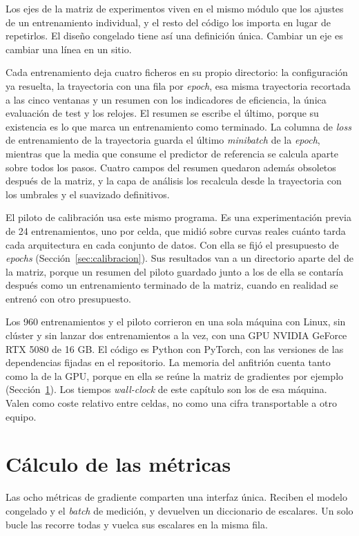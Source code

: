 Los ejes de la matriz de experimentos viven en el mismo módulo que los ajustes de un entrenamiento individual, y el resto del código los importa en lugar de repetirlos. El diseño congelado tiene así una definición única. Cambiar un eje es cambiar una línea en un sitio.

Cada entrenamiento deja cuatro ficheros en su propio directorio: la configuración ya resuelta, la trayectoria con una fila por \emph{epoch}, esa misma trayectoria recortada a las cinco ventanas y un resumen con los indicadores de eficiencia, la única evaluación de test y los relojes. El resumen se escribe el último, porque su existencia es lo que marca un entrenamiento como terminado. La columna de \emph{loss} de entrenamiento de la trayectoria guarda el último \emph{minibatch} de la \emph{epoch}, mientras que la media que consume el predictor de referencia se calcula aparte sobre todos los pasos. Cuatro campos del resumen quedaron además obsoletos después de la matriz, y la capa de análisis los recalcula desde la trayectoria con los umbrales y el suavizado definitivos.

El piloto de calibración usa este mismo programa. Es una experimentación previa de 24 entrenamientos, uno por celda, que midió sobre curvas reales cuánto tarda cada arquitectura en cada conjunto de datos. Con ella se fijó el presupuesto de \emph{epochs} (Sección~\ref{sec:calibracion}). Sus resultados van a un directorio aparte del de la matriz, porque un resumen del piloto guardado junto a los de ella se contaría después como un entrenamiento terminado de la matriz, cuando en realidad se entrenó con otro presupuesto.

Los 960 entrenamientos y el piloto corrieron en una sola máquina con Linux, sin clúster y sin lanzar dos entrenamientos a la vez, con una GPU NVIDIA GeForce RTX 5080 de 16 GB. El código es Python con PyTorch, con las versiones de las dependencias fijadas en el repositorio. La memoria del anfitrión cuenta tanto como la de la GPU, porque en ella se reúne la matriz de gradientes por ejemplo (Sección~\ref{sec:des-metricas}). Los tiempos \emph{wall-clock} de este capítulo son los de esa máquina. Valen como coste relativo entre celdas, no como una cifra transportable a otro equipo.

\section{Cálculo de las métricas}
\label{sec:des-metricas}

Las ocho métricas de gradiente comparten una interfaz única. Reciben el modelo congelado y el \emph{batch} de medición, y devuelven un diccionario de escalares. Un solo bucle las recorre todas y vuelca sus escalares en la misma fila.

